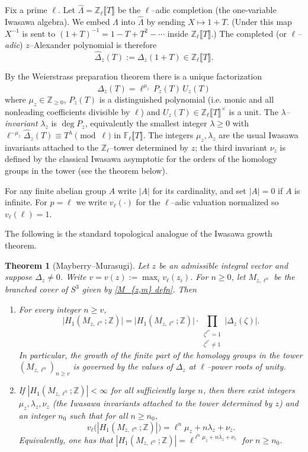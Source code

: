 \documentclass[table]{amsart}
\newtheorem{theorem}{Theorem}[section]
\numberwithin{equation}{section}
\begin{document}
Fix a prime $\ell$.  Let $\widehat{\Lambda}=\mathbb{Z}_\ell\llbracket T\rrbracket$
be the $\ell$--adic completion (the one-variable Iwasawa algebra).  We embed
$\Lambda$ into $\widehat{\Lambda}$ by sending $X\mapsto 1+T$.  (Under this
map $X^{-1}$ is sent to $(1+T)^{-1}=1-T+T^2-\cdots$ inside
$\mathbb{Z}_\ell\llbracket T\rrbracket$.)  The completed (or \emph{$\ell$--adic})
$z$--Alexander polynomial is therefore
\[
\widehat{\Delta}_z(T):=\Delta_z(1+T)\in\mathbb{Z}_\ell\llbracket T\rrbracket .
\]

By the Weierstrass preparation theorem there is a unique factorization
\[
\widehat{\Delta}_z(T)=\ell^{\mu_z}\,P_z(T)\,U_z(T)
\]
where $\mu_z\in\mathbb{Z}_{\ge0}$, $P_z(T)$ is a distinguished polynomial
(i.e. monic and all nonleading coefficients divisible by $\ell$) and
$U_z(T)\in\mathbb{Z}_\ell\llbracket T\rrbracket^\times$ is a unit.  The
\emph{$\lambda$--invariant} $\lambda_z$ is $\deg P_z$, equivalently the
smallest integer $\lambda\ge0$ with
\(\ell^{-\mu_z}\widehat{\Delta}_z(T)\equiv T^{\lambda}\pmod{\ell}\) in
$\mathbb{F}_\ell\llbracket T\rrbracket$.  The integers $\mu_z,\lambda_z$ are
the usual Iwasawa invariants attached to the $\mathbb{Z}_\ell$--tower
determined by $z$; the third invariant $\nu_z$ is defined by the classical
Iwasawa asymptotic for the orders of the homology groups in the tower (see
the theorem below).

For any finite abelian group $A$ write $|A|$ for its cardinality, and set
$|A|=0$ if $A$ is infinite.  For $p=\ell$ we write $v_\ell(\cdot)$ for the
$\ell$--adic valuation normalized so $v_\ell(\ell)=1$.

\par The following is the standard topological analogue of the Iwasawa growth
theorem.

\begin{theorem}[Mayberry--Murasugi]\label{MMthm}
Let $z$ be an admissible integral vector and suppose $\widehat{\Delta}_z\neq0$.
Write $v=v(z):=\max_i v_\ell(z_i)$. For $n\geq 0$, let $M_{z,\ell^n}$ be the branched cover of $S^3$ given by \eqref{M_{z,m} defn}. Then
\begin{enumerate}
  \item For every integer $n\ge v$,
  \[
  \big|H_1(M_{z,\ell^n};\mathbb{Z})\big|
  =\big|H_1(M_{z,\ell^v};\mathbb{Z})\big|
  \cdot
  \prod_{\substack{\zeta^{\ell^n}=1\\\zeta^{\ell^v}\ne1}}
  \big|\Delta_z(\zeta)\big|.
  \]
  In particular, the growth of the finite part of the homology groups in
  the tower \((M_{z,\ell^n})_{n\ge v}\) is governed by the values of
  \(\Delta_z\) at $\ell$--power roots of unity.

  \item If $|H_1(M_{z,\ell^n};\mathbb{Z})|<\infty$ for all sufficiently
  large $n$, then there exist integers $\mu_z,\lambda_z,\nu_z$ (the
  Iwasawa invariants attached to the tower determined by $z$) and an integer $n_0$
  such that for all $n\ge n_0$,
  \[
  v_\ell\big(|H_1(M_{z,\ell^n};\mathbb{Z})|\big)
  =\ell^n\mu_z + n\lambda_z + \nu_z.
  \]
  Equivalently, one has that $|H_1(M_{z,\ell^n};\mathbb{Z})|=\ell^{\ell^n\mu_z+n\lambda_z+\nu_z}$ for $n\geq n_0$.
\end{enumerate}
\end{theorem}
\end{document}
